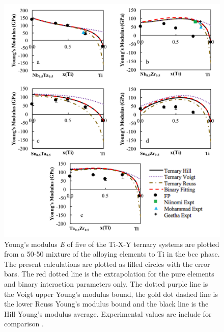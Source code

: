 \pagebreak
\begin{figure}[H]
	\centering
	\includegraphics[width=\textwidth]{Chapter-6/Figures/tixyyoungs2.png}
	\caption{Young's modulus \textit{E} of five of the Ti-X-Y ternary systems are plotted from a 50-50 mixture of the alloying elements to Ti in the bcc phase. The present calculations are plotted as filled circles with the error bars. The red dotted line is the extrapolation for the pure elements and binary interaction parameters only. The dotted purple line is the Voigt upper Young’s modulus bound, the gold dot dashed line is the lower Reuss Young’s modulus bound and the black line is the Hill Young’s modulus average. Experimental values are include for comparison \cite{Niinomi2012,Mohammed2014,Nozoe2007,Geetha2009}.}
	\label{Ch6-figure:tixyyoungs2}
\end{figure}

